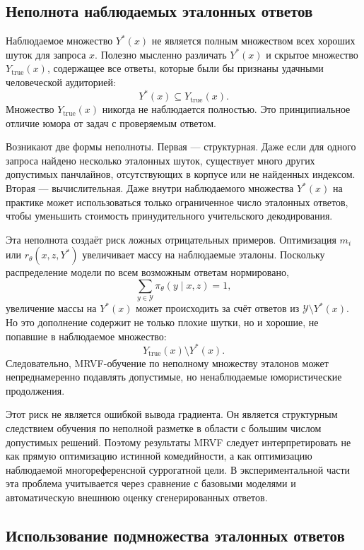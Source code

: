 \subsection{Неполнота наблюдаемых эталонных ответов}

Наблюдаемое множество \(Y^{*}(x)\) не является полным множеством всех хороших шуток для запроса \(x\). Полезно мысленно различать \(Y^{*}(x)\) и скрытое множество \(Y_{\mathrm{true}}(x)\), содержащее все ответы, которые были бы признаны удачными человеческой аудиторией:
\[
    Y^{*}(x)\subseteq Y_{\mathrm{true}}(x).
\]
Множество \(Y_{\mathrm{true}}(x)\) никогда не наблюдается полностью. Это принципиальное отличие юмора от задач с проверяемым ответом.

Возникают две формы неполноты. Первая --- структурная. Даже если для одного запроса найдено несколько эталонных шуток, существует много других допустимых панчлайнов, отсутствующих в корпусе или не найденных индексом. Вторая --- вычислительная. Даже внутри наблюдаемого множества \(Y^{*}(x)\) на практике может использоваться только ограниченное число эталонных ответов, чтобы уменьшить стоимость принудительного учительского декодирования.

Эта неполнота создаёт риск ложных отрицательных примеров. Оптимизация \(m_i\) или \(r_{\theta}(x,z,Y^{*})\) увеличивает массу на наблюдаемые эталоны. Поскольку распределение модели по всем возможным ответам нормировано,
\[
    \sum_{y\in\mathcal{Y}}
    \pi_{\theta}(y\mid x,z)
    =
    1,
\]
увеличение массы на \(Y^{*}(x)\) может происходить за счёт ответов из \(\mathcal{Y}\setminus Y^{*}(x)\). Но это дополнение содержит не только плохие шутки, но и хорошие, не попавшие в наблюдаемое множество:
\[
    Y_{\mathrm{true}}(x)\setminus Y^{*}(x).
\]
Следовательно, MRVF-обучение по неполному множеству эталонов может непреднамеренно подавлять допустимые, но ненаблюдаемые юмористические продолжения.

Этот риск не является ошибкой вывода градиента. Он является структурным следствием обучения по неполной разметке в области с большим числом допустимых решений. Поэтому результаты MRVF следует интерпретировать не как прямую оптимизацию истинной комедийности, а как оптимизацию наблюдаемой многореференсной суррогатной цели. В экспериментальной части эта проблема учитывается через сравнение с базовыми моделями и автоматическую внешнюю оценку сгенерированных ответов.

\subsection{Использование подмножества эталонных ответов}

